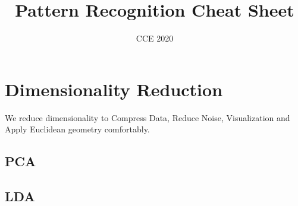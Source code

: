 \documentclass{article}
\title{Pattern Recognition Cheat Sheet}
\author{CCE 2020}
\begin{document}
\maketitle
\tableofcontents

\section{Dimensionality Reduction}
    We reduce dimensionality to Compress Data, 
    Reduce Noise, Visualization and Apply Euclidean geometry comfortably.
    \subsection{PCA}
        
    \subsection{LDA}
        
\end{document}
